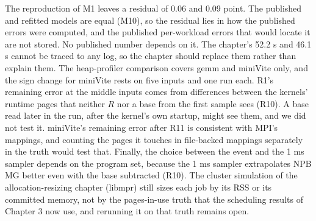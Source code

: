 \documentclass[11pt]{article}
\begin{document}
The reproduction of M1 leaves a residual of 0.06 and 0.09 point. The published and refitted models are equal
(M10), so the residual lies in how the published errors were computed, and the published per-workload errors that
would locate it are not stored. No published number depends on it.
The chapter's 52.2 s and 46.1 s cannot be traced to any log, so the chapter should replace them rather than explain
them. The heap-profiler comparison covers gemm and miniVite only, and the sign change for miniVite rests on five
inputs and one run each. R1's remaining error at the middle inputs comes from differences between the kernels' runtime pages that neither
$R$ nor a base from the first sample sees (R10). A base read later in the run, after the kernel's own startup,
might see them, and we did not test it. miniVite's remaining error after R11 is consistent with MPI's mappings, and
counting the pages it touches in file-backed mappings separately in the truth would test that. Finally, the
choice between the event and the 1 ms sampler depends on the program set, because the 1 ms sampler extrapolates
NPB MG better even with the base subtracted (R10). The cluster simulation of the allocation-resizing chapter
(libmpr) still sizes each job by its RSS or its committed memory, not by the pages-in-use truth that the
scheduling results of Chapter 3 now use, and rerunning it on that truth remains open.
\end{document}
